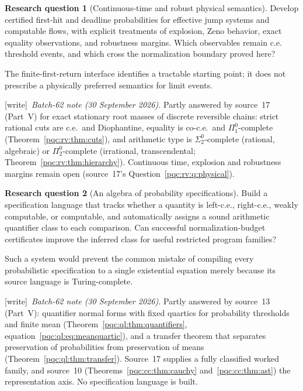 \documentclass[11pt,letterpaper]{article}
\numberwithin{equation}{section}
\theoremstyle{definition}
\newtheorem{question}{Research question}
\theoremstyle{remark}
\newcommand{\wtag}{\textup{[write]}}
\newcommand{\pione}{\Pi^0_1}
\newcommand{\sigtwo}{\Sigma^0_2}
\newcommand{\pitwo}{\Pi^0_2}
\begin{document}
\begin{question}[Continuous-time and robust physical semantics]\label{pqc:q:continuous}
Develop certified first-hit and deadline probabilities for effective jump
systems and computable flows, with explicit treatments of explosion,
Zeno behavior, exact equality observations, and robustness margins. Which
observables remain c.e. threshold events, and which cross the normalization
boundary proved here?
\end{question}
The finite-first-return interface identifies a tractable starting point;
it does not prescribe a physically preferred semantics for limit events.
\par\noindent\wtag\ \emph{Batch-62 note (30 September 2026).} Partly answered by source~17 (Part~V) for exact stationary root
masses of discrete reversible chains: strict rational cuts are c.e.\ and
Diophantine, equality is co-c.e.\ and $\pione$-complete
(Theorem~\ref{pqc:rv:thm:cuts}), and arithmetic type is $\sigtwo$-complete
(rational, algebraic) or $\pitwo$-complete (irrational, transcendental;
Theorem~\ref{pqc:rv:thm:hierarchy}). Continuous time, explosion and robustness
margins remain open (source~17's Question~\ref{pqc:rv:q:physical}).

\begin{question}[An algebra of probability specifications]\label{pqc:q:algebra}
Build a specification language that tracks whether a quantity is left-c.e.,
right-c.e., weakly computable, or computable, and automatically assigns a
sound arithmetic quantifier class to each comparison. Can successful
normalization-budget certificates improve the inferred class for useful
restricted program families?
\end{question}
Such a system would prevent the common mistake of compiling every
probabilistic specification to a single existential equation merely
because its source language is Turing-complete.
\par\noindent\wtag\ \emph{Batch-62 note (30 September 2026).} Partly answered by source~13 (Part~V): quantifier normal forms with fixed
quartics for probability thresholds and finite mean
(Theorem~\ref{pqc:ql:thm:quantifiers}, equation~\eqref{pqc:ql:eq:meanquartic}),
and a transfer theorem that separates preservation of probabilities from
preservation of means (Theorem~\ref{pqc:ql:thm:transfer}). Source~17 supplies a
fully classified worked family, and source~10
(Theorems~\ref{pqc:cc:thm:cauchy} and~\ref{pqc:cc:thm:ast}) the
representation axis. No specification language is built.
\end{document}
